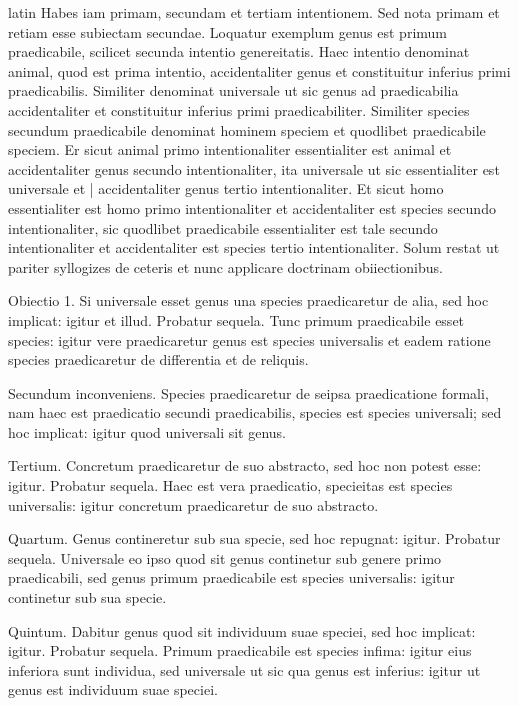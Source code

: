 \begin{otherlanguage*}{latin}
\pstart
Habes iam primam, secundam et tertiam intentionem. Sed nota primam et retiam esse subiectam secundae. Loquatur exemplum genus est primum praedicabile, scilicet secunda intentio genereitatis. Haec intentio denominat animal, quod est prima intentio, accidentaliter genus et constituitur inferius primi praedicabilis. Similiter denominat universale ut sic genus ad praedicabilia accidentaliter et constituitur inferius primi praedicabiliter. Similiter species secundum praedicabile denominat hominem speciem et quodlibet praedicabile speciem. Er sicut animal primo intentionaliter essentialiter est animal et accidentaliter genus secundo intentionaliter, ita universale ut sic essentialiter est universale et \textnormal{|} accidentaliter genus tertio intentionaliter. Et sicut homo essentialiter est homo primo intentionaliter et accidentaliter est species secundo intentionaliter, sic quodlibet praedicabile essentialiter est tale secundo intentionaliter et accidentaliter est species tertio intentionaliter. Solum restat ut pariter syllogizes de ceteris et nunc applicare doctrinam obiiectionibus. 
\pend

\pstart
Obiectio 1. Si universale esset genus una species praedicaretur de alia, sed hoc implicat:
igitur et illud. Probatur sequela. Tunc primum praedicabile esset species:
igitur vere praedicaretur genus est species universalis et eadem ratione species praedicaretur de differentia et de reliquis. 
\pend

\pstart
Secundum inconveniens. Species praedicaretur de seipsa praedicatione formali, nam haec est praedicatio secundi praedicabilis, species est species universali; sed hoc implicat:
igitur quod universali sit genus. 
\pend

\pstart
Tertium. Concretum praedicaretur de suo abstracto, sed hoc non potest esse:
igitur. Probatur sequela. Haec est vera praedicatio, specieitas est species universalis:
igitur concretum praedicaretur de suo abstracto. 
\pend

\pstart
Quartum. Genus contineretur sub sua specie, sed hoc repugnat:
igitur. Probatur sequela. Universale eo ipso quod sit genus continetur sub genere primo praedicabili, sed genus primum praedicabile est species universalis:
igitur continetur sub sua specie. 
\pend

\pstart
Quintum. Dabitur genus quod sit individuum suae speciei, sed hoc implicat:
igitur. Probatur sequela. Primum praedicabile est species infima:
igitur eius inferiora sunt individua, sed universale ut sic qua genus est inferius:
igitur ut genus est individuum suae speciei. 
\pend


\end{otherlanguage*}
